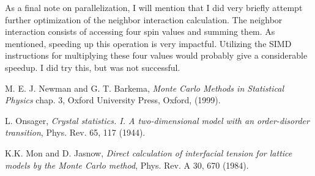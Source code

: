 \documentclass[12pt, a4paper]{article}
\begin{document}
As a final note on parallelization, I will mention that I did very briefly attempt further optimization of the neighbor interaction calculation.
The neighbor interaction consists of accessing four spin values and summing them.
As mentioned, speeding up this operation is very impactful.
Utilizing the SIMD instructions for multiplying these four values would probably give a considerable speedup.
I did try this, but was not successful.

\begin{thebibliography}{9}
 M. E. J. Newman and G. T. Barkema, \emph{Monte Carlo Methods in Statistical Physics} chap. 3, Oxford University Press, Oxford, (1999).

 L. Onsager, \emph{Crystal statistics. I. A two-dimensional model with an order-disorder transition},  Phys. Rev. 65, 117 (1944).

 K.K. Mon and D. Jasnow, \emph{Direct calculation of interfacial tension for lattice models by the Monte Carlo method}, Phys. Rev. A 30, 670 (1984). 
\end{thebibliography}
\end{document}
